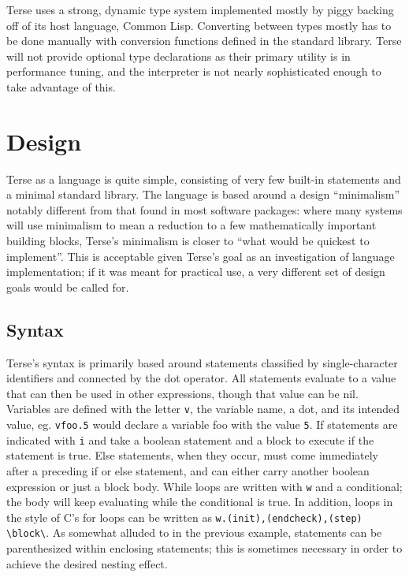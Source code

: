 \documentclass[12pt]{report}
\newcommand{\code}[1]{\texttt{#1}}
\newcommand{\bs}{\textbackslash}
\begin{document}
Terse uses a strong, dynamic type system implemented mostly by
piggy backing off of its host language, Common Lisp. Converting
between types mostly has to be done manually with conversion functions
defined in the standard library. Terse will not provide optional type
declarations as their primary utility is in performance tuning, and
the interpreter is not nearly sophisticated enough to take advantage
of this.

\section*{Design}

Terse as a language is quite simple, consisting of very few built-in
statements and a minimal standard library. The language is based
around a design ``minimalism'' notably different from that found in
most software packages: where many systems will use minimalism to mean
a reduction to a few mathematically important building blocks, Terse's
minimalism is closer to ``what would be quickest to implement''. This
is acceptable given Terse's goal as an investigation of language
implementation; if it was meant for practical use, a very different
set of design goals would be called for.

\subsection*{Syntax}

Terse's syntax is primarily based around statements classified by
single-character identifiers and connected by the dot operator. All
statements evaluate to a value that can then be used in other
expressions, though that value can be nil. Variables are defined with
the letter \code{v}, the variable name, a dot, and its intended value,
eg. \code{vfoo.5} would declare a variable foo with the value
\code{5}. If statements are indicated with \code{i} and take a boolean
statement and a block to execute if the statement is true. Else
statements, when they occur, must come immediately after a preceding
if or else statement, and can either carry another boolean expression
or just a block body. While loops are written with \code{w} and a
conditional; the body will keep evaluating while the conditional is
true. In addition, loops in the style of C's for loops can be written
as \code{w.(init),(endcheck),(step) \bs{}block\bs{}}. As somewhat
alluded to in the previous example, statements can be parenthesized
within enclosing statements; this is sometimes necessary in order to
achieve the desired nesting effect.
\end{document}
